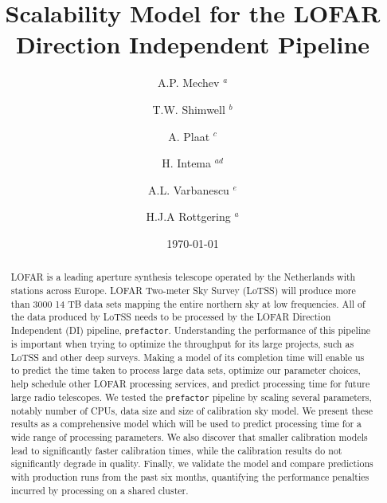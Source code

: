 \documentclass[preprint,5p]{elsarticle}
\begin{document}
\sloppy
{}
\begin{frontmatter}


\title{Scalability Model for the LOFAR Direction Independent Pipeline}%
\author{A.P. Mechev $^a$}

\author{T.W. Shimwell $^b$}%
\author{A. Plaat $^c$}%
\author{H. Intema $^{ad}$}%
\author{A.L. Varbanescu $^e$}
\author{H.J.A Rottgering $^a$}%

\date{\today} 
\address{$^a$ Leiden Observatory, Niels Bohrweg 2, 2333 CA Leiden, the Netherlands}
\address{$^b$ ASTRON, Oude Hoogeveensedijk 4, 7991 PD , The Netherlands }
\address{$^c$ Leiden Institute of Advanced Computer Science, Niels Bohrweg 1, 2333 CA Leiden, the Netherlands}
\address{$^d$ International Centre for Radio Astronomy Research -- Curtin University, GPO Box U1987, Perth, WA 6845, Australia}
\address{$^e$ University of Amsterdam, Spui 21, 1012 WX Amsterdam, the Netherlands}


\begin{abstract}
LOFAR is a leading aperture synthesis telescope operated by the Netherlands with stations across Europe. LOFAR Two-meter Sky Survey (LoTSS) will produce more than 3000 14 TB data sets mapping the entire northern sky at low frequencies. All of the data produced by LoTSS needs to be processed by the LOFAR Direction Independent (DI) pipeline, \texttt{prefactor}. Understanding the performance of this pipeline is important when trying to optimize the throughput for its large projects, such as LoTSS and other deep surveys. Making a model of its completion time will enable us to predict the time taken to process large data sets, optimize our parameter choices, help schedule other LOFAR processing services, and predict processing time for future large radio telescopes. We tested the \texttt{prefactor} pipeline by scaling several parameters, notably number of CPUs, data size and size of calibration sky model. We present these results as a comprehensive model which will be used to predict processing time for a wide range of processing parameters. We also discover that smaller calibration models lead to significantly faster calibration times, while the calibration results do not significantly degrade in quality. Finally, we validate the model and compare predictions with production runs from the past six months, quantifying the performance penalties incurred by processing on a shared cluster. 


\end{abstract}
\end{frontmatter}
\end{document}
